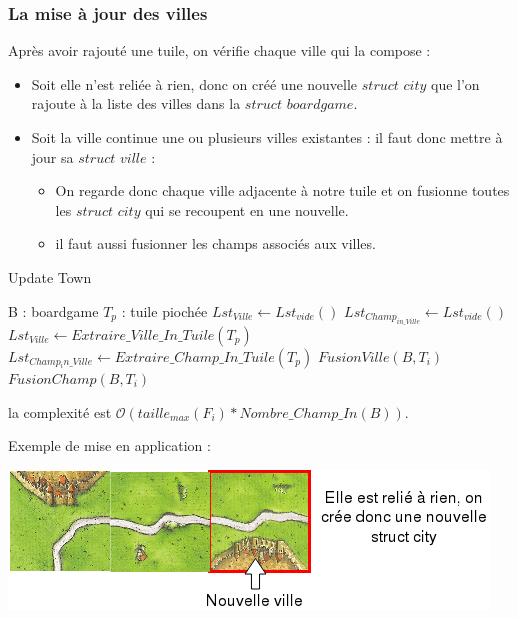 \subsubsection{La mise à jour des villes}
Après avoir rajouté une tuile, on vérifie chaque ville qui la compose :
\begin{itemize}
    \item Soit elle n'est reliée à rien, donc on créé une nouvelle $struct$ $city$ que l'on rajoute à la liste des villes dans la $struct$ $boardgame$.
    \item Soit la ville continue une ou plusieurs villes existantes : il faut donc mettre à jour sa $struct$ $ville$ :
    \begin{itemize}
        \item On regarde donc chaque ville adjacente à notre tuile et on fusionne toutes les $struct$ $city$ qui se recoupent en une nouvelle.
        \item il faut aussi fusionner les champs associés aux villes.
    \end{itemize}
\end{itemize}
\begin{algorithm}[!h]
\caption{Update Town}
\begin{algorithmic} [!h]
\REQUIRE  B : boardgame
\REQUIRE  $T_p $ : tuile piochée
\STATE $Lst_{Ville} \leftarrow Lst_{vide}()$
\STATE $Lst_{Champ_{in\_Ville}} \leftarrow Lst_{vide}()$
\STATE $Lst_{Ville} \leftarrow Extraire\_Ville\_In\_Tuile(T_p) $
\STATE $Lst_{Champ{_in\_Ville}} \leftarrow Extraire\_Champ\_In\_Tuile(T_p) $
\STATE $FusionVille(B,T_i)$
\ENDFOR
{}
\STATE $FusionChamp(B,T_i)$
\ENDFOR
\end{algorithmic}
\end{algorithm}
\newpage 
la complexité est $\mathcal{O}(taille_{max}(F_i) * Nombre\_Champ\_In(B))$.



\vspace{0.5cm}
Exemple de mise en application :

\includegraphics[scale=1]{villeModif2.png}

